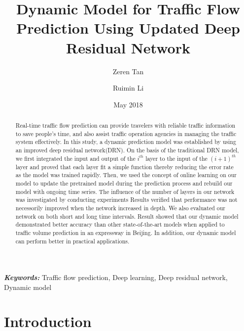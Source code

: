 \documentclass[twocolumn]{article}
\providecommand{\keywords}[1]
{
  \small    
  \textbf{\textit{Keywords:}} #1
}
\begin{document}
\title{Dynamic Model for Traffic Flow Prediction Using Updated Deep Residual Network}
\author[a]{Zeren Tan}
\author[b]{Ruimin Li}


\date{May 2018}

\maketitle
\begin{abstract}
    Real-time traffic flow prediction can provide travelers with reliable traffic information to save people's time, and also assist traffic operation agencies in managing the traffic system effectively.  In this study, a dynamic prediction model was established by using an improved deep residual network(DRN). On the basis of the traditional DRN model, we  first integrated the input and output of the $i^{th}$ layer to the input of the $(i+1)^{th}$ layer and proved that each layer fit a simple function thereby reducing the error rate as the model was trained rapidly. Then, we used the concept of online learning on our model to update the pretrained model during the prediction process and rebuild our model with ongoing time series. The influence of the number of layers in our network was investigated by conducting experiments Results verified that performance was not necessorily improved when the network increased in depth. We also evaluated our network on both short and long time intervals. Result showed that our dynamic model demonstrated better accuracy than other state-of-the-art models when applied to traffic volume prediction in an expressway in Beijing. In addition, our dynamic model can perform better in practical applications. 
    
\end{abstract}
\keywords{Traffic flow prediction, Deep learning, Deep residual network, Dynamic model}
\section{Introduction}
\end{document}
